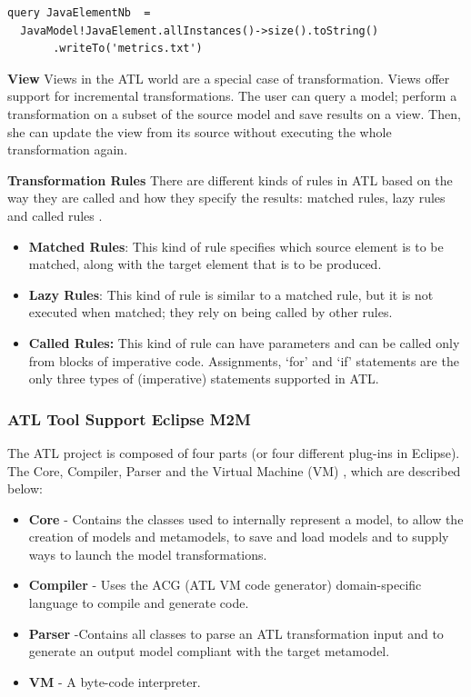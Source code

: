 \vspace{\baselineskip}
\begin{lstlisting}[style=umplePlain]
query JavaElementNb  =
  JavaModel!JavaElement.allInstances()->size().toString()
       .writeTo('metrics.txt')
\end{lstlisting}


\textbf{View}
Views in the ATL world are a special case of transformation. Views offer support for incremental transformations. The user can query a model; perform a transformation on a subset of the source model and save results on a view. Then, she can update the view from its source without executing the whole transformation again. 

\textbf{Transformation Rules}
There are different kinds of rules in ATL based on the way they are called and how they specify the results: matched rules, lazy rules and called rules \cite{stephan2009comparative}.

\begin{itemize}
\item \textbf{Matched Rules}: 	This kind of rule specifies which source element is to be matched, along with the target element that is to be produced.

\item \textbf{Lazy Rules}: This kind of rule is similar to a matched rule, but it is not executed when matched; they rely on being called by other rules.

\item \textbf{Called Rules:}	This kind of rule can have parameters and can be called only from blocks of imperative code. Assignments, `for' and `if' statements are the only three types of (imperative) statements supported in ATL.

\end{itemize}

\subsubsection{ATL Tool Support \textemdash Eclipse M2M}
The ATL project is composed of four parts (or four different plug-ins in Eclipse). The Core, Compiler, Parser and the Virtual Machine (VM) \cite{Jouault200831}, which are described below:

\begin{itemize}
\item \textbf{Core} - Contains the classes used to internally represent a model, to allow the creation of models and metamodels, to save and load models and to supply ways to launch the model transformations. 
\item \textbf{Compiler} - Uses the ACG (ATL VM code generator) domain-specific language to compile and generate code. 
\item \textbf{Parser} -Contains all classes to parse an ATL transformation input and to generate an output model compliant with the target metamodel.
\item \textbf{VM} - A byte-code interpreter.
\end{itemize}


